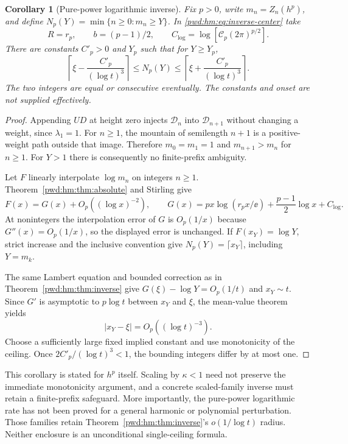 \documentclass[11pt,letterpaper]{article}
\numberwithin{equation}{section}
\newtheorem{corollary}[theorem]{Corollary}
\theoremstyle{remark}\newtheorem{remark}[theorem]{Remark}
\newcommand{\Dyck}{\mathcal D}
\begin{document}
\begin{corollary}[Pure-power logarithmic inverse]\label{pwd:hm:cor:pure-inverse}
Fix $p>0$, write $m_n=Z_n(h^p)$, and define
$N_p(Y)=\min\{n\ge0:m_n\ge Y\}$. In \eqref{pwd:hm:eq:inverse-center} take
\[
 R=r_p,\qquad b=(p-1)/2,\qquad C_{\log}=\log[\mathcal{C}_p(2\pi)^{p/2}].
\]
There are constants $C'_p>0$ and $Y_p$ such that for $Y\ge Y_p$,
\begin{equation}\label{pwd:hm:eq:pure-inverse}
 \left\lceil\xi-\frac{C'_p}{(\log t)^3}\right\rceil
 \le N_p(Y)\le
 \left\lceil\xi+\frac{C'_p}{(\log t)^3}\right\rceil.
\end{equation}
The two integers are equal or consecutive eventually. The constants and onset are not supplied effectively.
\end{corollary}
\begin{proof}
Appending $UD$ at height zero injects $\Dyck_n$ into $\Dyck_{n+1}$ without changing a weight, since $\lambda_1=1$. For $n\ge1$, the mountain of semilength $n+1$ is a positive-weight path outside that image. Therefore $m_0=m_1=1$ and $m_{n+1}>m_n$ for $n\ge1$. For $Y>1$ there is consequently no finite-prefix ambiguity.

Let $F$ linearly interpolate $\log m_n$ on integers $n\ge1$. Theorem~\ref{pwd:hm:thm:absolute} and Stirling give
\[
 F(x)=G(x)+O_p((\log x)^{-2}),\qquad
 G(x)=px\log(r_px/\ee)+\frac{p-1}{2}\log x+C_{\log}.
\]
At nonintegers the interpolation error of $G$ is $O_p(1/x)$ because $G''(x)=O_p(1/x)$, so the displayed error is unchanged. If $F(x_Y)=\log Y$, strict increase and the inclusive convention give $N_p(Y)=\lceil x_Y\rceil$, including $Y=m_k$.

The same Lambert equation and bounded correction as in Theorem~\ref{pwd:hm:thm:inverse} give $G(\xi)-\log Y=O_p(1/t)$ and $x_Y\sim t$. Since $G'$ is asymptotic to $p\log t$ between $x_Y$ and $\xi$, the mean-value theorem yields
\[
 |x_Y-\xi|=O_p((\log t)^{-3}).
\]
Choose a sufficiently large fixed implied constant and use monotonicity of the ceiling. Once $2C'_p/(\log t)^3<1$, the bounding integers differ by at most one.
\end{proof}
This corollary is stated for $h^p$ itself. Scaling by $\kappa<1$ need not preserve the immediate monotonicity argument, and a concrete scaled-family inverse must retain a finite-prefix safeguard. More importantly, the pure-power logarithmic rate has not been proved for a general harmonic or polynomial perturbation. Those families retain Theorem~\ref{pwd:hm:thm:inverse}'s $o(1/\log t)$ radius. Neither enclosure is an unconditional single-ceiling formula.
\end{document}
